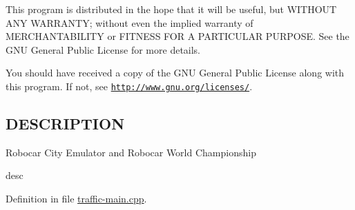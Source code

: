 This program is distributed in the hope that it will be useful, but W\-I\-T\-H\-O\-U\-T A\-N\-Y W\-A\-R\-R\-A\-N\-T\-Y; without even the implied warranty of M\-E\-R\-C\-H\-A\-N\-T\-A\-B\-I\-L\-I\-T\-Y or F\-I\-T\-N\-E\-S\-S F\-O\-R A P\-A\-R\-T\-I\-C\-U\-L\-A\-R P\-U\-R\-P\-O\-S\-E. See the G\-N\-U General Public License for more details.

You should have received a copy of the G\-N\-U General Public License along with this program. If not, see \href{http://www.gnu.org/licenses/}{\tt http\-://www.\-gnu.\-org/licenses/}.\hypertarget{traffic_8cpp_DESCRIPTION}{}\subsection{D\-E\-S\-C\-R\-I\-P\-T\-I\-O\-N}\label{traffic_8cpp_DESCRIPTION}
Robocar City Emulator and Robocar World Championship

desc 

Definition in file \hyperlink{traffic-main_8cpp_source}{traffic-\/main.\-cpp}.

